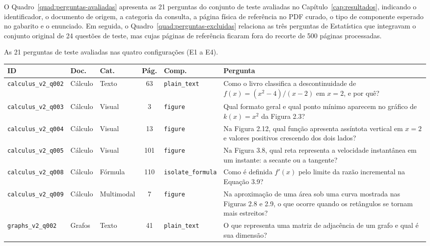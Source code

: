 \label{ap:perguntas}

O Quadro~\ref{quad:perguntas-avaliadas} apresenta as 21 perguntas do conjunto de teste avaliadas no Capítulo~\ref{cap:resultados}, indicando o identificador, o documento de origem, a categoria da consulta, a página física de referência no PDF curado, o tipo de componente esperado no gabarito e o enunciado. Em seguida, o Quadro~\ref{quad:perguntas-excluidas} relaciona as três perguntas de Estatística que integravam o conjunto original de 24 questões de teste, mas cujas páginas de referência ficaram fora do recorte de 500 páginas processadas.

\begin{quadro}[htbp]
\centering
\caption{As 21 perguntas de teste avaliadas nas quatro configurações (E1 a E4).}
\label{quad:perguntas-avaliadas}
\begingroup
\scriptsize
\setlength{\tabcolsep}{3.5pt}
\renewcommand{\arraystretch}{0.96}
\begin{tabularx}{\textwidth}{|l|l|l|c|l|X|}
\hline
\textbf{ID} & \textbf{Doc.} & \textbf{Cat.} & \textbf{Pág.} & \textbf{Comp.} & \textbf{Pergunta} \\
\hline
\texttt{calculus\_v2\_q002} & Cálculo & Texto & 63 & \texttt{plain\_text} & Como o livro classifica a descontinuidade de $f(x)=(x^2-4)/(x-2)$ em $x=2$, e por quê? \\
\hline
\texttt{calculus\_v2\_q003} & Cálculo & Visual & 3 & \texttt{figure} & Qual formato geral e qual ponto mínimo aparecem no gráfico de $k(x)=x^2$ da Figura 2.3? \\
\hline
\texttt{calculus\_v2\_q004} & Cálculo & Visual & 13 & \texttt{figure} & Na Figura 2.12, qual função apresenta assíntota vertical em $x=2$ e valores positivos crescendo dos dois lados? \\
\hline
\texttt{calculus\_v2\_q005} & Cálculo & Visual & 101 & \texttt{figure} & Na Figura 3.8, qual reta representa a velocidade instantânea em um instante: a secante ou a tangente? \\
\hline
\texttt{calculus\_v2\_q008} & Cálculo & Fórmula & 110 & \texttt{isolate\_formula} & Como é definida $f'(x)$ pelo limite da razão incremental na Equação 3.9? \\
\hline
\texttt{calculus\_v2\_q009} & Cálculo & Multimodal & 7 & \texttt{figure} & Na aproximação de uma área sob uma curva mostrada nas Figuras 2.8 e 2.9, o que ocorre quando os retângulos se tornam mais estreitos? \\
\hline
\texttt{graphs\_v2\_q002} & Grafos & Texto & 41 & \texttt{plain\_text} & O que representa uma matriz de adjacência de um grafo e qual é sua dimensão? \\

\end{tabularx}
\end{quadro}

